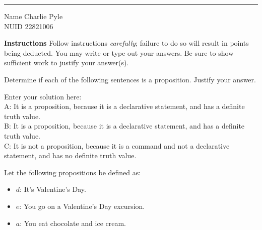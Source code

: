 \documentclass[10pt]{exam}
\begin{document}
\hrule

\vspace{.50cm} Name Charlie Pyle 
\\ NUID 22821006
\vspace{.50cm}

\textbf{Instructions} Follow instructions \emph{carefully}; failure to do so will result in points being deducted. You may write or type out your answers. Be sure to show sufficient work to justify your answer(s).


\begin{questions}

\question[6] Determine if each of the following sentences is a proposition. Justify your answer.

\begin{solution}
    Enter your solution here:
    \\ A: It is a proposition, because it is a declarative statement, and has a definite truth value.
    \vspace{.1cm}
    \\B: It is a proposition, because it is a declarative statement, and has a definite truth value.
    \vspace{.1cm}
    \\C: It is not a proposition, because it is a command and not a declarative statement, and has no definite truth value. 
\end{solution}

\question[12] Let the following propositions be defined as:
\begin{itemize}
  \item $d$: It's Valentine's Day.
  \item $e$: You go on a Valentine’s Day excursion.
  \item $a$: You eat chocolate and ice cream.
\end{itemize}


\end{questions}
\end{document}

